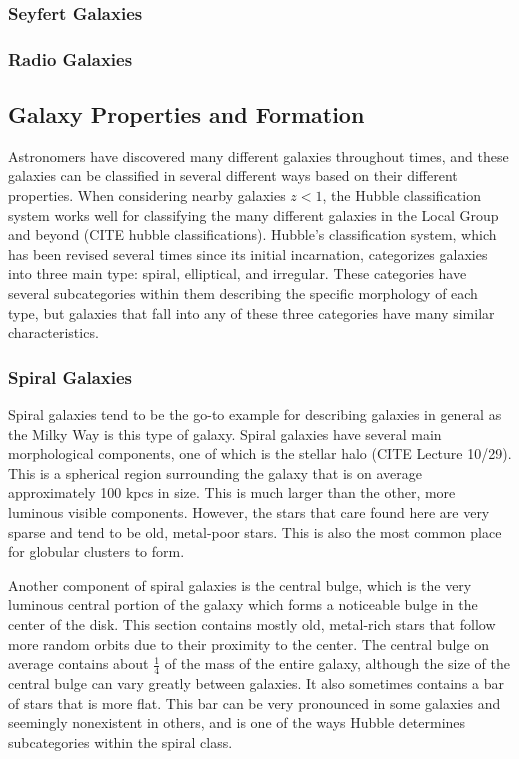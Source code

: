 \documentclass[12pt]{article}
\begin{document}
    \subsubsection*{Seyfert Galaxies}

    \subsubsection*{Radio Galaxies}

\subsection*{\bf Galaxy Properties and Formation}
Astronomers have discovered many different galaxies throughout times, and these
galaxies can be classified in several different ways based on their different
properties.  When considering nearby galaxies $z \lt 1$, the Hubble
classification system works well for classifying the many different galaxies in
the Local Group and beyond (CITE hubble classifications).  Hubble's
classification system, which has been revised several times since its initial
incarnation, categorizes galaxies into three main type: spiral, elliptical, and
irregular.  These categories have several subcategories within them describing
the specific morphology of each type, but galaxies that fall into any of these
three categories have many similar characteristics.

    \subsubsection*{Spiral Galaxies}
    Spiral galaxies tend to be the go-to example for describing galaxies in general
    as the Milky Way is this type of galaxy.  Spiral galaxies have several main
    morphological components, one of which is the stellar halo (CITE Lecture 10/29).
    This is a spherical region surrounding the galaxy that is on average
    approximately 100 kpcs in size.  This is much larger than the other, more
    luminous visible components.  However, the stars that care found here are very
    sparse and tend to be old, metal-poor stars.  This is also the most common place
    for globular clusters to form.

    Another component of spiral galaxies is the central bulge, which is the very
    luminous central portion of the galaxy which forms a noticeable bulge in the
    center of the disk.  This section contains mostly old, metal-rich stars that
    follow more random orbits due to their proximity to the center.  The central
    bulge on average contains about $\frac{1}{4}$ of the mass of the entire
    galaxy, although the size of the central bulge can vary greatly between
    galaxies.  It also sometimes contains a bar of stars that is more flat.
    This bar can be very pronounced in some galaxies and seemingly nonexistent
    in others, and is one of the ways Hubble determines subcategories within the
    spiral class.
\end{document}
